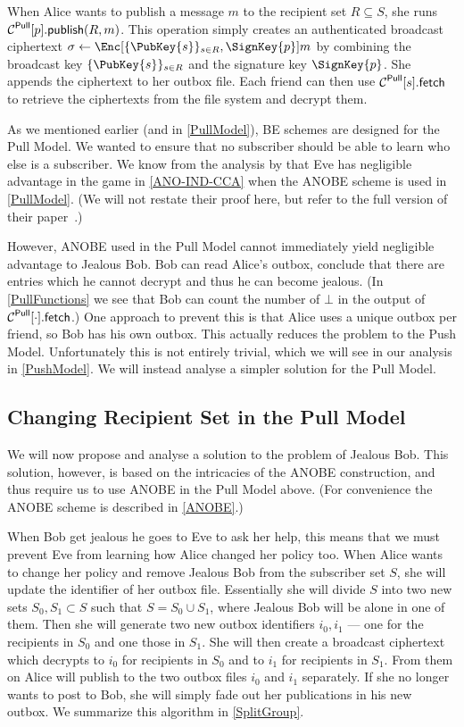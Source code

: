 When Alice wants to publish a message \(m\) to the recipient set \(R\subseteq 
  S\), she runs \(\ppub{p}[R][m]\).
This operation simply creates an authenticated broadcast ciphertext 
\(\sigma\gets \Enc[\{\PubKey{s}\}_{s\in R}, \SignKey{p}]{m}\) by combining the 
broadcast key \(\{\PubKey{s}\}_{s\in R}\) and the signature key 
\(\SignKey{p}\).
She appends the ciphertext to her outbox file.
Each friend can then use \(\pget{s}\) to retrieve the ciphertexts from the file 
system and decrypt them.

As we mentioned earlier (and in \cref{PullModel}), \ac{BE} schemes are designed 
for the Pull Model.
We wanted to ensure that no subscriber should be able to learn who else is 
a subscriber.
We know from the analysis by \citet{ANOBE} that Eve has negligible advantage in 
the game in \cref{ANO-IND-CCA} when the \ac{ANOBE} scheme is used in 
\cref{PullModel}.
(We will not restate their proof here, but refer to the full version of their 
paper~\cite{ANOBE}.)

However, \ac{ANOBE} used in the Pull Model cannot immediately yield negligible 
advantage to Jealous Bob.
Bob can read Alice's outbox, conclude that there are entries which he cannot 
decrypt and thus he can become jealous.
(In \cref{PullFunctions} we see that Bob can count the number of \(\bot\) in 
the output of \(\pget{\cdot}\).)
One approach to prevent this is that Alice uses a unique outbox per friend, so 
Bob has his own outbox.
This actually reduces the problem to the Push Model.
Unfortunately this is not entirely trivial, which we will see in our analysis 
in \cref{PushModel}.
We will instead analyse a simpler solution for the Pull Model.

\subsection{Changing Recipient Set in the Pull Model}
\label{ChangingPullRecipientSet}

We will now propose and analyse a solution to the problem of Jealous Bob.
This solution, however, is based on the intricacies of the \ac{ANOBE} 
construction, and thus require us to use \ac{ANOBE} in the Pull Model above.
(For convenience the \ac{ANOBE} scheme is described in \cref{ANOBE}.)

When Bob get jealous he goes to Eve to ask her help, this means that we must 
prevent Eve from learning how Alice changed her policy too.
When Alice wants to change her policy and remove Jealous Bob from the 
subscriber set \(S\), she will update the identifier of her outbox file.
Essentially she will divide \(S\) into two new sets \(S_0, S_1\subset S\) such 
that \(S = S_0\cup S_1\), where Jealous Bob will be alone in one of them.
Then she will generate two new outbox identifiers \(i_0, i_1\) --- one for the 
recipients in \(S_0\) and one those in \(S_1\).
She will then create a broadcast ciphertext which decrypts to \(i_0\) for 
recipients in \(S_0\) and to \(i_1\) for recipients in \(S_1\).
From them on Alice will publish to the two outbox files \(i_0\) and \(i_1\) 
separately.
If she no longer wants to post to Bob, she will simply fade out her 
publications in his new outbox.
We summarize this algorithm in \cref{SplitGroup}.

